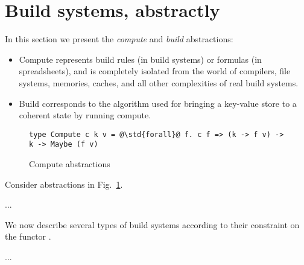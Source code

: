 \clearpage

\section{Build systems, abstractly}\label{sec-abstractions}

In this section we present the \emph{compute} and \emph{build} abstractions:
\begin{itemize}
    \item Compute represents build rules (in build systems) or formulas (in
    spreadsheets), and is completely isolated from the world of compilers, file
    systems, memories, caches, and all other complexities of real build systems.
    \item Build corresponds to the algorithm used for bringing a key-value store
    to a coherent state by running compute.
\end{itemize}

\begin{figure}
\begin{verbatim}
type Compute c k v = @\std{forall}@ f. c f => (k -> f v) -> k -> Maybe (f v)
\end{verbatim}
\caption{Compute abstractions}\label{fig-compute}
\end{figure}

Consider abstractions in Fig.~\ref{fig-compute}.

...

We now describe several types of build systems according to their constraint
on the functor .

...

